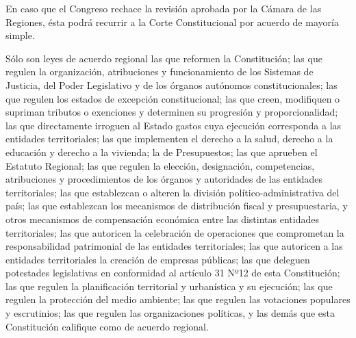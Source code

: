 \documentclass[11pt, a4paper]{article}
\begin{document}
\begin{enumerate}
En caso que el Congreso rechace la revisión aprobada por la Cámara de las Regiones, ésta podrá recurrir a la Corte Constitucional por acuerdo de mayoría simple. 

Sólo son leyes de acuerdo regional las que reformen la Constitución; las que regulen la organización, atribuciones y funcionamiento de los Sistemas de Justicia, del Poder Legislativo y de los órganos autónomos constitucionales; las que regulen los estados de excepción constitucional; las que creen, modifiquen o supriman tributos o exenciones y determinen su progresión y proporcionalidad; las que directamente irroguen al Estado gastos cuya ejecución corresponda a las entidades territoriales; las que implementen el derecho a la salud, derecho a la educación y derecho a la vivienda; la de Presupuestos; las que aprueben el Estatuto Regional; las que regulen la elección, designación, competencias, atribuciones y procedimientos de los órganos y autoridades de las entidades territoriales; las que establezcan o alteren la división político-administrativa del país; las que establezcan los mecanismos de distribución fiscal y presupuestaria, y otros mecanismos de compensación económica entre las distintas entidades territoriales; las que autoricen la celebración de operaciones que comprometan la responsabilidad patrimonial de las entidades territoriales; las que autoricen a las entidades territoriales la creación de empresas públicas; las que deleguen potestades legislativas en conformidad al artículo 31 Nº12 de esta Constitución; las que regulen la planificación territorial y urbanística y su ejecución; las que regulen la protección del medio ambiente; las que regulen las votaciones populares y escrutinios; las que regulen las organizaciones políticas, y las demás que esta Constitución califique como de acuerdo regional. 



\end{enumerate}
\end{document}
